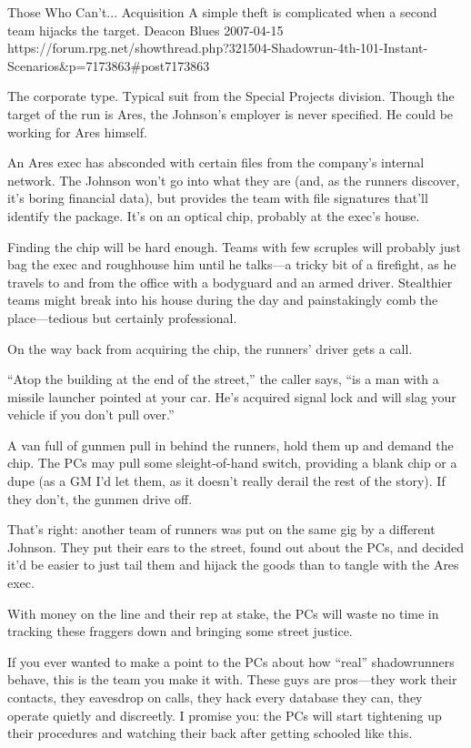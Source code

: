 \begin{scenario}{Those Who Can't...}
	{Acquisition}
	{A simple theft is complicated when a second team hijacks the target.}
	{Deacon Blues}
	{2007-04-15}
	{https://forum.rpg.net/showthread.php?321504-Shadowrun-4th-101-Instant-Scenarios\&p=7173863\#post7173863}

 The corporate type. Typical suit from the Special Projects division. Though the target of the run is Ares, the Johnson's employer is never specified. He could be working for Ares himself.

\synopsis An Ares exec has absconded with certain files from the company's internal network. The Johnson won't go into what they are (and, as the runners discover, it's boring financial data), but provides the team with file signatures that'll identify the package. It's on an optical chip, probably at the exec's house.

Finding the chip will be hard enough. Teams with few scruples will probably just bag the exec and roughhouse him until he talks---a tricky bit of a firefight, as he travels to and from the office with a bodyguard and an armed driver. Stealthier teams might break into his house during the day and painstakingly comb the place---tedious but certainly professional.

\twist On the way back from acquiring the chip, the runners' driver gets a call.

``Atop the building at the end of the street,'' the caller says, ``is a man with a missile launcher pointed at your car. He's acquired signal lock and will slag your vehicle if you don't pull over.''

A van full of gunmen pull in behind the runners, hold them up and demand the chip. The PCs may pull some sleight-of-hand switch, providing a blank chip or a dupe (as a GM I'd let them, as it doesn't really derail the rest of the story). If they don't, the gunmen drive off.

That's right: another team of runners was put on the same gig by a different Johnson. They put their ears to the street, found out about the PCs, and decided it'd be easier to just tail them and hijack the goods than to tangle with the Ares exec.

With money on the line and their rep at stake, the PCs will waste no time in tracking these fraggers down and bringing some street justice.

\notes  If you ever wanted to make a point to the PCs about how ``real'' shadowrunners behave, this is the team you make it with. These guys are pros---they work their contacts, they eavesdrop on calls, they hack every database they can, they operate quietly and discreetly. I promise you: the PCs will start tightening up their procedures and watching their back after getting schooled like this. 

\end{scenario}
